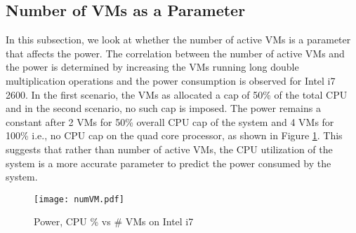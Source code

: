 \documentclass{sig-alternate}
\begin{document}
\subsection{Number of VMs as a Parameter}
In this subsection, we look at whether the number of active VMs is a parameter that affects the power. The correlation between the number of active VMs and the power is determined by increasing the VMs running long double multiplication operations and the power consumption is observed for Intel i7 2600. In the first scenario, the VMs as allocated a cap of 50\% of the total CPU and in the second scenario, no such cap is imposed. The power remains a constant after 2 VMs for 50\% overall CPU cap of the system and 4 VMs for 100\% i.e., no CPU cap on the quad core processor, as shown in Figure \ref{fig:numVM}. This suggests that rather than number of active VMs, the CPU utilization of the system is a more accurate parameter to predict the power consumed by the system. 
\begin{figure}[!htbp]
\vspace{-0.5cm}
\begin{center}
 \texttt{[image: numVM.pdf]}
\vspace{-0.5cm}
\caption{Power, CPU \% vs \# VMs on Intel i7}
\label{fig:numVM}
\vspace{-0.5cm}
\end{center}

\end{figure}
\end{document}
